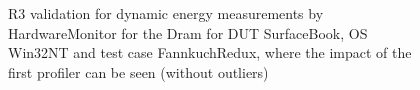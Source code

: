 \begin{figure}
                            \caption{R3 validation for dynamic energy measurements by HardwareMonitor for the Dram for DUT SurfaceBook, OS Win32NT and test case FannkuchRedux, where the impact of the first profiler can be seen (without outliers)} \label{fig:SurfaceBook_HardwareMonitor_Dram_R3_dynamic_energy_without_outliers_Win32NT_avg_watts}
                            \end{figure}
                            